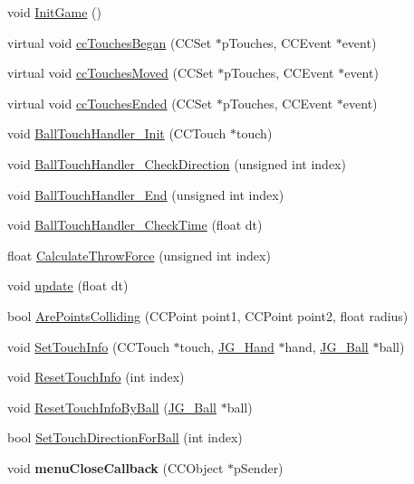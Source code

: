 \begin{DoxyCompactItemize}
\item 
void \hyperlink{class_j_g___game___main_ab7f59e22bd1ddc6f849ceb4731e6f123}{Init\-Game} ()
\item 
virtual void \hyperlink{class_j_g___game___main_a9c8aac91fd97b7a88da7819b8ead4206}{cc\-Touches\-Began} (C\-C\-Set $\ast$p\-Touches, C\-C\-Event $\ast$event)
\item 
virtual void \hyperlink{class_j_g___game___main_ad3ecad4bd190ff37f5b6ba1da9fbe16c}{cc\-Touches\-Moved} (C\-C\-Set $\ast$p\-Touches, C\-C\-Event $\ast$event)
\item 
virtual void \hyperlink{class_j_g___game___main_a0bc1f108b8a56226cfe84ce9d28d56b4}{cc\-Touches\-Ended} (C\-C\-Set $\ast$p\-Touches, C\-C\-Event $\ast$event)
\item 
void \hyperlink{class_j_g___game___main_afe6f0284267c514ca1c81673d015ad91}{Ball\-Touch\-Handler\-\_\-\-Init} (C\-C\-Touch $\ast$touch)
\item 
void \hyperlink{class_j_g___game___main_aa0d9b99e2acd78c8763557d1c0e8a244}{Ball\-Touch\-Handler\-\_\-\-Check\-Direction} (unsigned int index)
\item 
void \hyperlink{class_j_g___game___main_af02d329a7f3a6ac86d8b233dd9ff0741}{Ball\-Touch\-Handler\-\_\-\-End} (unsigned int index)
\item 
void \hyperlink{class_j_g___game___main_a4accf9781acdb8a94450eca925574902}{Ball\-Touch\-Handler\-\_\-\-Check\-Time} (float dt)
\item 
float \hyperlink{class_j_g___game___main_a3b28b2a51aeaa909d6fb95471103bb72}{Calculate\-Throw\-Force} (unsigned int index)
\item 
void \hyperlink{class_j_g___game___main_aea78b9aef2cf228b6945fa88bf741c3a}{update} (float dt)
\item 
bool \hyperlink{class_j_g___game___main_a0b93b253ff5f67b688c12848c63c9e2c}{Are\-Points\-Colliding} (C\-C\-Point point1, C\-C\-Point point2, float radius)
\item 
void \hyperlink{class_j_g___game___main_abda6daf16a4bdfb1d197bcedce380f8e}{Set\-Touch\-Info} (C\-C\-Touch $\ast$touch, \hyperlink{class_j_g___hand}{J\-G\-\_\-\-Hand} $\ast$hand, \hyperlink{class_j_g___ball}{J\-G\-\_\-\-Ball} $\ast$ball)
\item 
void \hyperlink{class_j_g___game___main_a24a120d001b984dc67f211cdb79ce811}{Reset\-Touch\-Info} (int index)
\item 
void \hyperlink{class_j_g___game___main_a2f8dd795fb006e6b052dbe29aef917cf}{Reset\-Touch\-Info\-By\-Ball} (\hyperlink{class_j_g___ball}{J\-G\-\_\-\-Ball} $\ast$ball)
\item 
bool \hyperlink{class_j_g___game___main_a0fab6585f29f1324aea00bdade4e01f4}{Set\-Touch\-Direction\-For\-Ball} (int index)
\item 
\hypertarget{class_j_g___game___main_a42558255c3477748cfadf9d501a02b56}{void {\bfseries menu\-Close\-Callback} (C\-C\-Object $\ast$p\-Sender)}\label{class_j_g___game___main_a42558255c3477748cfadf9d501a02b56}


\end{DoxyCompactItemize}
